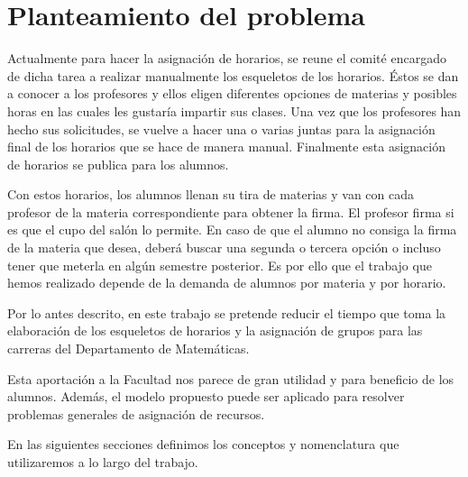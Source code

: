 \chapter{Planteamiento del problema}

Actualmente para hacer la asignación de horarios, se reune el comité encargado de dicha tarea a realizar manualmente los esqueletos de los horarios. Éstos se dan a conocer a los profesores y ellos eligen diferentes opciones de materias y posibles horas en las cuales les gustaría impartir sus clases. Una vez que los profesores han hecho sus solicitudes, se vuelve a hacer una o varias juntas para la asignación final de los horarios que se hace de manera manual. Finalmente esta asignación de horarios se publica para los alumnos.

Con estos horarios, los alumnos llenan su tira de materias y van con cada profesor de la materia correspondiente para obtener la firma. El profesor firma si es que el cupo del salón lo permite. En caso de que el alumno no consiga la firma de la materia que desea, deberá buscar una segunda o tercera opción o incluso tener que meterla en algún semestre posterior. Es por ello que el trabajo que hemos realizado depende de la demanda de alumnos por materia y por horario.


Por lo antes descrito, en este trabajo se pretende reducir el tiempo que toma la elaboración de los esqueletos de horarios y la asignación de grupos para las carreras del Departamento de Matemáticas. 

Esta aportación a la Facultad nos parece de gran utilidad y para beneficio de los alumnos. Además, el modelo propuesto puede ser aplicado para resolver problemas generales de asignación de recursos.


En las siguientes secciones definimos los conceptos y nomenclatura que utilizaremos a lo largo del trabajo.


